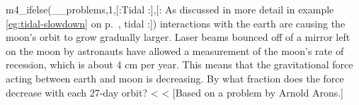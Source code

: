 m4_ifelse(__problems,1,[:Tidal
:],[:%
As discussed in more detail in 
example \ref{eg:tidal-slowdown} on p.~\pageref{eg:tidal-slowdown},
tidal
:])%
interactions with the earth are causing the
moon's orbit to grow gradually larger. Laser beams bounced
off of a mirror left on the moon by astronauts have allowed
a measurement of the moon's rate of recession, which is
about 4 cm per year. This means that the gravitational force
acting between earth and moon is decreasing. By what
fraction does the force decrease with each 27-day orbit?
<%
<%
[Based on a problem by Arnold Arons.]
